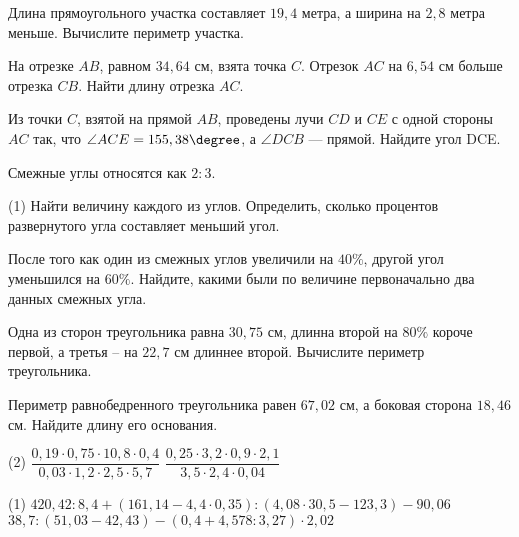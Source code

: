 %
%

\begin{class}[number=1]
	\begin{listofex}
		\item Длина прямоугольного участка составляет \( 19,4 \) метра, а ширина на \( 2,8 \) метра меньше. Вычислите периметр участка.
		\item На отрезке \( AB \), равном \( 34,64  \) см, взята точка \( C \).
		Отрезок \( AC \) на \( 6,54 \) см больше отрезка \( CB \). Найти длину отрезка \( AC \).
		\item Из точки \( C \), взятой на прямой \( AB \), проведены лучи \( CD \) и \( CE \) с одной стороны \( AC \) так, что \( \angle ACE = 155,38\degree \), а  \( \angle DCB  \) ---
		прямой. Найдите угол DCE. 
		\item Смежные углы относятся как \( 2:3 \). \begin{tasks}(1)
			\task[а)] Найти величину каждого из углов. 
			\task[б)] Определить, сколько процентов
			развернутого угла составляет меньший угол.
		\end{tasks}
		\item После того как один из смежных углов увеличили на \( 40\% \), другой угол уменьшился
		на \( 60\% \). Найдите, какими были по величине первоначально два данных смежных
		угла.
		\item Одна из сторон треугольника равна \( 30,75 \) см, длинна второй на \( 80\% \) короче первой, а третья – на \( 22,7 \) см длиннее второй. Вычислите периметр треугольника.
		\item Периметр равнобедренного треугольника равен \( 67,02 \) см, а боковая сторона \( 18,46 \) см. Найдите длину его основания.
		\item 
		\begin{tasks}(2)
			\task\( \dfrac{0,19\cdot0,75\cdot10,8\cdot0,4}{0,03\cdot1,2 \cdot2,5\cdot5,7 }\)
			\task \( \dfrac{0,25\cdot3,2\cdot0,9\cdot2,1}{3,5\cdot2,4 \cdot0,04} \)
		\end{tasks}
		\item 
		\begin{tasks}(1)
			\task \( 420,42:8,4+(161,14-4,4\cdot0,35):(4,08\cdot30,5-123,3)-90,06 \)
			\task \( 38,7:(51,03-42,43)-(0,4+4,578:3,27)\cdot2,02 \)
		\end{tasks}
	\end{listofex}
\end{class}

